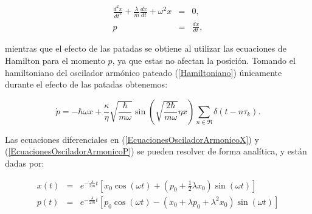 \documentclass[letterpaper,12pt,oneside]{book}
\begin{document}
	\begin{eqnarray}
		\frac{d^2x}{dt^2} + \frac{\lambda}{m}\frac{dx}{dt} + \omega^2 x & = & 0, \label{EcuacionesOsciladorArmonicoX}\\
		p & = & \frac{dx}{dt},\label{EcuacionesOsciladorArmonicoP}
	\end{eqnarray}
	
	\noindent mientras que el efecto de las patadas se obtiene al utilizar las ecuaciones de Hamilton para el momento $p$, ya que estas no afectan la posici\'on. Tomando el hamiltoniano del oscilador arm\'onico pateado (\ref{Hamiltoniano}) \'unicamente durante el efecto de las patadas obtenemos:
	
	\begin{equation}\label{EcuacionCambioP}
		\dot{p} = -\hbar\omega x + \frac{\kappa}{\eta}\sqrt{\frac{\hbar}{m\omega}} \sin \left( \sqrt{\frac{2\hbar}{m\omega}}\eta x \right) \sum_{n\in\Re}\delta(t - n\tau_k).
	\end{equation}
	
	Las ecuaciones diferenciales en (\ref{EcuacionesOsciladorArmonicoX}) y (\ref{EcuacionesOsciladorArmonicoP}) se pueden resolver de forma anal\'itica, y est\'an dadas por:
	
	\begin{eqnarray}
		x(t) & = & e^{-\frac{\lambda}{2m}t}\left[ x_0\cos(\omega t) + (p_0 + \frac{1}{2}\lambda x_0)\sin(\omega t) \right] \\
		p(t) & = & e^{-\frac{\lambda}{2m}t} \left[ p_0\cos(\omega t) - (x_0 + \lambda p_0 + \lambda^2x_0)\sin(\omega t) \right]
	\end{eqnarray}
	
\end{document}
